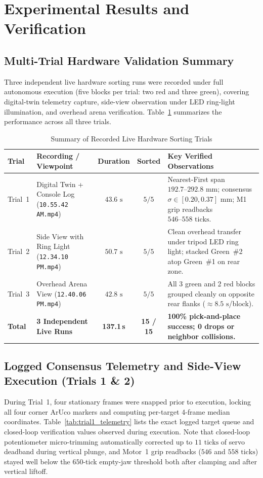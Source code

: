 \documentclass[11pt,a4paper]{article}
\begin{document}
\section{Experimental Results and Verification}

\subsection{Multi-Trial Hardware Validation Summary}
Three independent live hardware sorting runs were recorded under full autonomous execution (five blocks per trial: two red and three green), covering digital-twin telemetry capture, side-view observation under LED ring-light illumination, and overhead arena verification. Table~\ref{tab:trials} summarizes the performance across all three trials.

\begin{table}[H]
  \centering
  \small
  \caption{Summary of Recorded Live Hardware Sorting Trials}
  \label{tab:trials}
  \begin{tabularx}{\textwidth}{@{}>{\raggedright\arraybackslash}p{1.6cm} >{\raggedright\arraybackslash}p{4.3cm} c c X@{}}
    \toprule
    \textbf{Trial} & \textbf{Recording / Viewpoint} & \textbf{Duration} & \textbf{Sorted} & \textbf{Key Verified Observations} \\
    \midrule
    Trial~1 & Digital Twin + Console Log (\texttt{10.55.42 AM.mp4}) & $43.6\text{ s}$ & $5 / 5$ & Nearest-First span $192.7\text{--}292.8\text{ mm}$; consensus $\sigma \in [0.20, 0.37]\text{ mm}$; M1 grip readbacks $546\text{--}558\text{ ticks}$. \\
    Trial~2 & Side View with Ring Light (\texttt{12.34.10 PM.mp4}) & $50.7\text{ s}$ & $5 / 5$ & Clean overhead transfer under tripod LED ring light; stacked Green~\#2 atop Green~\#1 on rear zone. \\
    Trial~3 & Overhead Arena View (\texttt{12.40.06 PM.mp4}) & $42.8\text{ s}$ & $5 / 5$ & All 3 green and 2 red blocks grouped cleanly on opposite rear flanks ($\approx 8.5\text{ s}$/block). \\
    \midrule
    \textbf{Total} & \textbf{3 Independent Live Runs} & \textbf{137.1\,s} & \textbf{15 / 15} & \textbf{100\% pick-and-place success; 0 drops or neighbor collisions.} \\
    \bottomrule
  \end{tabularx}
\end{table}

\subsection{Logged Consensus Telemetry and Side-View Execution (Trials 1 \& 2)}
During Trial~1, four stationary frames were snapped prior to execution, locking all four corner ArUco markers and computing per-target 4-frame median coordinates. Table~\ref{tab:trial1_telemetry} lists the exact logged target queue and closed-loop verification values observed during execution. Note that closed-loop potentiometer micro-trimming automatically corrected up to $11\text{ ticks}$ of servo deadband during vertical plunge, and Motor~1 grip readbacks ($546$ and $558\text{ ticks}$) stayed well below the $650$-tick empty-jaw threshold both after clamping and after vertical liftoff.
\end{document}
